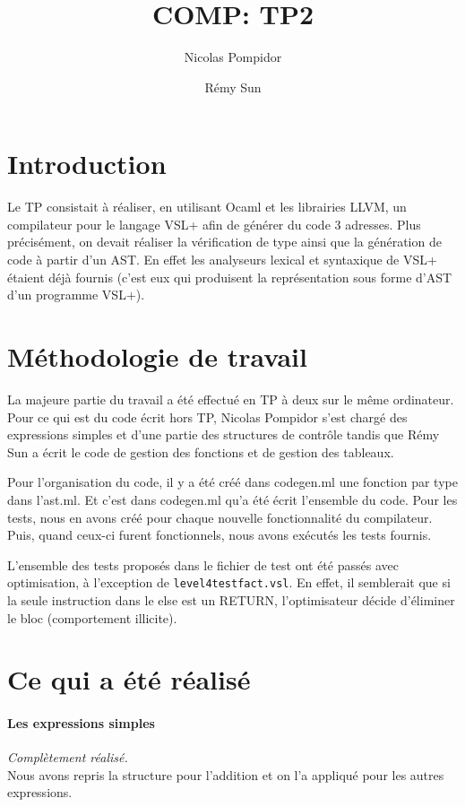 \documentclass{article}
\title{COMP: TP2}
\author{Nicolas Pompidor \and Rémy Sun}
\begin{document}
\maketitle

\section{Introduction}

Le TP consistait à réaliser, en utilisant Ocaml et les librairies LLVM, un compilateur pour le 
langage VSL+ afin de générer du code 3 adresses. Plus précisément, on devait réaliser la 
vérification de type ainsi que la génération de code à partir d'un AST. En effet les analyseurs lexical 
et syntaxique de VSL+ étaient déjà fournis (c'est eux qui produisent la représentation sous forme 
d'AST d'un programme VSL+).

\section{Méthodologie de travail}

La majeure partie du travail a été effectué en TP  à deux sur le même
ordinateur. Pour ce qui est du code écrit hors TP, Nicolas Pompidor s'est chargé
des expressions simples et d'une partie des structures de contrôle tandis que
Rémy Sun a écrit le code de gestion des fonctions et de gestion des tableaux.

Pour l'organisation du code, il y a été créé dans codegen.ml une fonction par type dans 
l'ast.ml. Et c'est dans codegen.ml qu'a été écrit l'ensemble du code.
Pour les tests, nous en avons créé pour chaque nouvelle fonctionnalité du compilateur. Puis, 
quand ceux-ci furent fonctionnels, nous avons exécutés les tests fournis.

L'ensemble des tests proposés dans le fichier de test ont été passés avec
optimisation, à l'exception de \texttt{level4testfact.vsl}. En effet, il
semblerait que si la seule instruction dans le else est un RETURN,
l'optimisateur décide d'éliminer le bloc (comportement illicite).

\section{Ce qui a été réalisé}

\paragraph{Les expressions simples}
\textit{Complètement réalisé.}\\
Nous avons repris la structure pour l'addition et on l'a appliqué pour les autres expressions.
 
\end{document}
